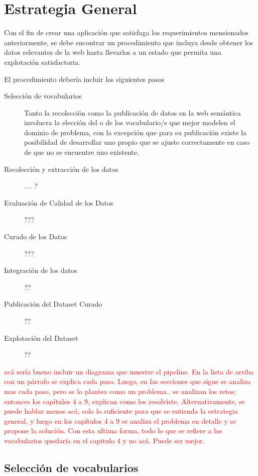 \chapter{Estrategia General}
\label{chapter:estrategia}

Con el fin de crear una aplicación que satisfaga los requerimientos mensionados anteriormente, se debe encontrar
un procedimiento que incluya desde obtener los datos relevantes de la web hasta llevarlos a un estado que permita una 
explotación satisfactoria. 

El procedimiento debería incluir los siguientes pasos  

\begin{description}
\item[Selección de vocabularios ] Tanto la recolección como la publicación de datos en la web semántica involucra la elección del o de los vocabulario/s que mejor modelen el dominio de problema, con la excepción que para su publicación existe la posibilidad de desarrollar uno propio que se ajuste correctamente en caso de que no se encuentre uno existente. 
\item[Recolección y extracción de los datos ] .... ?
\item[Evaluación de Calidad de los Datos] ???
\item[Curado de los Datos] ???
\item[Integración de los datos] ?? 
\item[Publicación del Dataset Curado] ?? 
\item[Explotación del Dataset] ?? 
\end{description}

\begin{framed}
\textcolor{red}{acá sería bueno incluir un diagrama que muestre el pipeline. En la lista de arriba con un párrafo se explica cada paso. Luego, en las secciones que sigue se analiza mas cada paso, pero se lo plantea como un problema.. se analizan los retos; entonces los capítulos 4 a 9, explican como los resolviste. Alternativamente, se puede hablar menos acá, solo lo suficiente para que se entienda la estrategia general, y luego en los capítulos 4 a 9 se analiza el problema en detalle y se propone la solución. Con esta ultima forma, todo lo que se refiere a los vocabularios quedaría en el capitulo 4 y no acá. Puede ser mejor.}
\end{framed}


\section{Selección de vocabularios}

